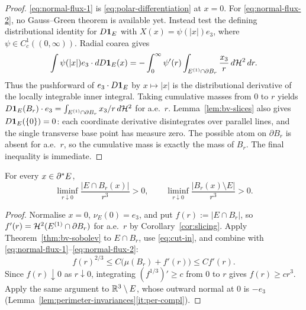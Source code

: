 \begin{proof}
\eqref{eq:normal-flux-1} is \eqref{eq:polar-differentiation} at $x=0$.  For
\eqref{eq:normal-flux-2}, no Gauss--Green theorem is available yet.  Instead
test the defining distributional identity for $D\mathbf 1_{E}$ with
$X(x)=\psi(|x|)e_3$, where $\psi\in C_c^1((0,\infty))$.  Radial coarea gives
\[
 \int\psi(|x|)e_3\cdot dD\mathbf 1_{E}(x)
 =-\int_0^\infty\psi'(r)
     \int_{E^{(1)}\cap\partial B_r}\frac{x_3}{r}\,d\mathcal H^2\,dr .
\]
Thus the pushforward of $e_3\cdot D\mathbf 1_{E}$ by $x\mapsto|x|$ is the
distributional derivative of the locally integrable inner integral.  Taking
cumulative masses from $0$ to $r$ yields
$D\mathbf 1_{E}(B_r)\cdot e_3
=\int_{E^{(1)}\cap\partial B_r}x_3/r\,d\mathcal H^2$ for a.e.\ $r$.
Lemma~\ref{lem:bv-slices} also gives $D\mathbf 1_{E}(\{0\})=0$: each coordinate
derivative disintegrates over parallel lines, and the single transverse base
point has measure zero.  The possible atom on $\partial B_r$ is absent for
a.e.\ $r$, so the cumulative mass is exactly the mass of $B_r$.  The final
inequality is immediate.
\end{proof}

\begin{lemma}\label{lem:reduced-density}
For every $x\in\partial^* E$,
\begin{equation}\label{eq:reduced-density}
  \liminf_{r\downarrow0}\frac{|E\cap B_r(x)|}{r^3}>0,
  \qquad
  \liminf_{r\downarrow0}\frac{|B_r(x)\setminus E|}{r^3}>0 .
\end{equation}
\end{lemma}

\begin{proof}
Normalise $x=0$, $\nu_E(0)=e_3$, and put $f(r):=|E\cap B_r|$, so
$f'(r)=\mathcal H^2(E^{(1)}\cap\partial B_r)$ for a.e.\ $r$ by
Corollary~\ref{cor:slicing}.  Apply Theorem~\ref{thm:bv-sobolev} to
$E\cap B_r$, use \eqref{eq:cut-in}, and combine with
\eqref{eq:normal-flux-1}--\eqref{eq:normal-flux-2}:
\begin{equation}\label{eq:reduced-density-ode}
  f(r)^{2/3}\le C\bigl(\mu(B_r)+f'(r)\bigr)\le Cf'(r).
\end{equation}
Since $f(r)\downarrow0$ as $r\downarrow0$, integrating
$(f^{1/3})'\ge c$ from $0$ to $r$ gives $f(r)\ge cr^3$.  Apply the same
argument to $\mathbb R^3\setminus E$, whose outward normal at $0$ is $-e_3$
(Lemma~\ref{lem:perimeter-invariances}\ref{it:per-compl}).
\end{proof}

